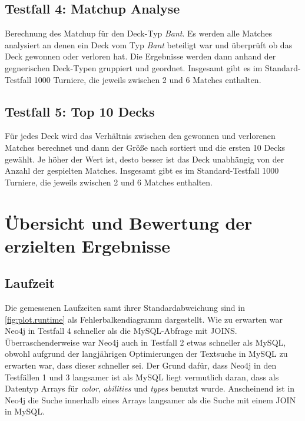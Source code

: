 \subsection{Testfall 4: Matchup Analyse}
Berechnung des Matchup für den Deck-Typ \emph{Bant}. Es werden alle Matches analysiert an denen ein Deck vom Typ \emph{Bant} beteiligt war und überprüft ob das Deck gewonnen oder verloren hat. Die Ergebnisse werden dann anhand der gegnerischen Deck-Typen gruppiert und geordnet. Insgesamt gibt es im Standard-Testfall 1000 Turniere, die jeweils zwischen 2 und 6 Matches enthalten.  

\subsection{Testfall 5: Top 10 Decks}
Für jedes Deck wird das Verhältnis zwischen den gewonnen und verlorenen Matches berechnet und dann der Größe nach sortiert und die ersten 10 Decks gewählt. Je höher der Wert ist, desto besser ist das Deck unabhängig von der Anzahl der gespielten Matches. Insgesamt gibt es im Standard-Testfall 1000 Turniere, die jeweils zwischen 2 und 6 Matches enthalten. 

\section{Übersicht und Bewertung der erzielten Ergebnisse}
\subsection{Laufzeit}
Die gemessenen Laufzeiten samt ihrer Standardabweichung sind in \autoref{fig:plot.runtime} als Fehlerbalkendiagramm dargestellt.
Wie zu erwarten war Neo4j in Testfall 4 schneller als die MySQL-Abfrage mit JOINS. Überraschenderweise war Neo4j auch in Testfall 2 etwas schneller als MySQL, obwohl aufgrund der langjährigen Optimierungen der Textsuche in MySQL zu erwarten war, dass dieser schneller sei.
Der Grund dafür, dass Neo4j in den Testfällen 1 und 3 langsamer ist als MySQL liegt vermutlich daran, dass als Datentyp Arrays für \emph{color}, \emph{abilities} und \emph{types} benutzt wurde. Anscheinend ist in Neo4j die Suche innerhalb eines Arrays langsamer als die Suche mit einem JOIN in MySQL.

